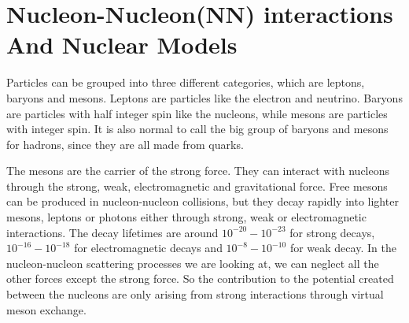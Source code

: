 \label{chap:innledning}


\section[Nucleon-Nucleon models]{Nucleon-Nucleon(NN) interactions And Nuclear Models}



Particles can be grouped into three different categories, which are leptons, baryons and mesons.
Leptons are particles like the electron and neutrino. 
Baryons are particles with half integer spin like the nucleons,
while mesons are particles with integer spin.
It is also normal to call the big group of baryons and mesons for hadrons, since they are all made from quarks.

The mesons are the carrier of the strong force. They can interact with nucleons through the strong, weak,
electromagnetic and gravitational force. Free mesons can be produced in nucleon-nucleon collisions, but they decay
rapidly into lighter mesons, leptons or photons either through strong, weak or electromagnetic interactions. 
The decay lifetimes are around $10^{-20}-10^{-23}$ for strong decays, $10^{-16}-10^{-18}$ for electromagnetic decays 
and $10^{-8}-10^{-10}$ for weak decay. In the nucleon-nucleon scattering processes we are looking at, we can
neglect all the other forces except the strong force. So the contribution to the potential created between
the nucleons are  only arising from strong interactions through virtual meson exchange.

